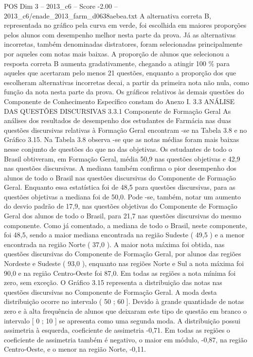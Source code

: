 \begin{textsample}{POS Dim 3 – 2013\_c6 – Score -2.00 – 2013\_c6/enade\_2013\_farm\_d0638aebea.txt}
A alternativa correta B, representada no gráfico pela curva em verde, foi escolhida em maiores proporções pelos alunos com desempenho melhor nesta parte da prova.
Já as alternativas incorretas, também denominadas distratores, foram selecionadas principalmente por aqueles com notas mais baixas.
A proporção de alunos que selecionou a resposta correta B aumenta gradativamente, chegando a atingir 100 \% para aqueles que acertaram pelo menos 21 questões, enquanto a proporção dos que escolheram alternativas incorretas decai, a partir da primeira nota não nula, como função da nota nesta parte da prova.
Os gráficos relativos às demais questões do Componente de Conhecimento Específico constam do Anexo I. 3.3 ANÁLISE DAS QUESTÕES DISCURSIVAS 3.3.1 Componente de Formação Geral As análises dos resultados de desempenho dos estudantes de Farmácia nas duas questões discursivas relativas à Formação Geral encontram -se na Tabela 3.8 e no Gráfico 3.15.
Na Tabela 3.8 observa -se que as notas médias foram mais baixas nesse conjunto de questões do que no das objetivas.
Os estudantes de todo o Brasil obtiveram, em Formação Geral, média 50,9 nas questões objetivas e 42,9 nas questões discursivas.
A mediana também confirma o pior desempenho dos alunos de todo o Brasil nas questões discursivas do Componente de Formação Geral.
Enquanto essa estatística foi de 48,5 para questões discursivas, para as questões objetivas a mediana foi de 50,0.
Pode -se, também, notar um aumento do desvio padrão de 17,9, nas questões objetivas do Componente de Formação Geral dos alunos de todo o Brasil, para 21,7 nas questões discursivas do mesmo componente.
Como já comentado, a mediana de todo o Brasil, neste componente, foi 48,5, sendo a maior mediana encontrada na região Sudeste ( 49,5 ) e a menor encontrada na região Norte ( 37,0 ).
A maior nota máxima foi obtida, nas questões discursivas do Componente de Formação Geral, por alunos das regiões Nordeste e Sudeste ( 93,0 ), enquanto nas regiões Norte e Sul a nota máxima foi 90,0 e na região Centro-Oeste foi 87,0.
Em todas as regiões a nota mínima foi zero, sem exceção.
O Gráfico 3.15 representa a distribuição das notas nas questões discursivas no Componente de Formação Geral.
A moda desta distribuição ocorre no intervalo ( 50 ; 60 ].
Devido à grande quantidade de notas zero e à alta frequência de alunos que deixaram este tipo de questão em branco o intervalo [ 0 ; 10 ] se apresenta como uma segunda moda.
A distribuição possui assimetria à esquerda, coeficiente de assimetria -0,71.
Em todas as regiões o coeficiente de assimetria também é negativo, o maior em módulo, -0,87, na região Centro-Oeste, e o menor na região Norte, -0,11.

\end{textsample}
